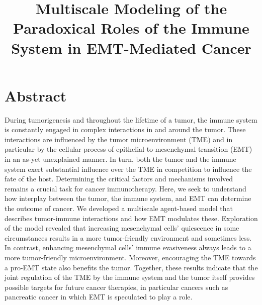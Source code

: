 \documentclass{article}
\begin{document}
 \title{Multiscale Modeling of the Paradoxical Roles of the Immune System in EMT-Mediated Cancer}
 \maketitle

\section*{Abstract}
During tumorigenesis and throughout the lifetime of a tumor, the immune system is constantly engaged in complex interactions in and around the tumor.
These interactions are influenced by the tumor microenvironment (TME) and in particular by the cellular process of epithelial-to-mesenchymal transition (EMT) in an as-yet unexplained manner.
In turn, both the tumor and the immune system exert substantial influence over the TME in competition to influence the fate of the host.
Determining the critical factors and mechanisms involved remains a crucial task for cancer immunotherapy.
Here, we seek to understand how interplay between the tumor, the immune system, and EMT can determine the outcome of cancer.
We developed a multiscale agent-based model that describes tumor-immune interactions and how EMT modulates these.
Exploration of the model revealed that increasing mesenchymal cells' quiescence in some circumstances results in a more tumor-friendly environment and sometimes less.
In contrast, enhancing mesenchymal cells' immune evasiveness always leads to a more tumor-friendly microenvironment.
Moreover, encouraging the TME towards a pro-EMT state also benefits the tumor.
Together, these results indicate that the joint regulation of the TME by the immune system and the tumor itself provides possible targets for future cancer therapies, in particular cancers such as pancreatic cancer in which EMT is speculated to play a role.

\end{document}
